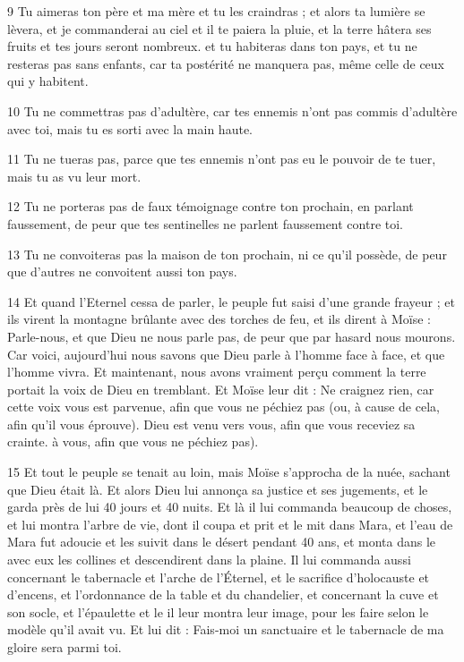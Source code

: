 \par 9 Tu aimeras ton père et ma mère et tu les craindras ; et alors ta lumière se lèvera, et je commanderai au ciel et il te paiera la pluie, et la terre hâtera ses fruits et tes jours seront nombreux. et tu habiteras dans ton pays, et tu ne resteras pas sans enfants, car ta postérité ne manquera pas, même celle de ceux qui y habitent.

\par 10 Tu ne commettras pas d'adultère, car tes ennemis n'ont pas commis d'adultère avec toi, mais tu es sorti avec la main haute.

\par 11 Tu ne tueras pas, parce que tes ennemis n'ont pas eu le pouvoir de te tuer, mais tu as vu leur mort.

\par 12 Tu ne porteras pas de faux témoignage contre ton prochain, en parlant faussement, de peur que tes sentinelles ne parlent faussement contre toi.

\par 13 Tu ne convoiteras pas la maison de ton prochain, ni ce qu'il possède, de peur que d'autres ne convoitent aussi ton pays.

\par 14 Et quand l'Eternel cessa de parler, le peuple fut saisi d'une grande frayeur ; et ils virent la montagne brûlante avec des torches de feu, et ils dirent à Moïse : Parle-nous, et que Dieu ne nous parle pas, de peur que par hasard nous mourons. Car voici, aujourd’hui nous savons que Dieu parle à l’homme face à face, et que l’homme vivra. Et maintenant, nous avons vraiment perçu comment la terre portait la voix de Dieu en tremblant. Et Moïse leur dit : Ne craignez rien, car cette voix vous est parvenue, afin que vous ne péchiez pas (ou, à cause de cela, afin qu'il vous éprouve). Dieu est venu vers vous, afin que vous receviez sa crainte. à vous, afin que vous ne péchiez pas).

\par 15 Et tout le peuple se tenait au loin, mais Moïse s'approcha de la nuée, sachant que Dieu était là. Et alors Dieu lui annonça sa justice et ses jugements, et le garda près de lui 40 jours et 40 nuits. Et là il lui commanda beaucoup de choses, et lui montra l'arbre de vie, dont il coupa et prit et le mit dans Mara, et l'eau de Mara fut adoucie et les suivit dans le désert pendant 40 ans, et monta dans le avec eux les collines et descendirent dans la plaine. Il lui commanda aussi concernant le tabernacle et l'arche de l'Éternel, et le sacrifice d'holocauste et d'encens, et l'ordonnance de la table et du chandelier, et concernant la cuve et son socle, et l'épaulette et le il leur montra leur image, pour les faire selon le modèle qu'il avait vu. Et lui dit : Fais-moi un sanctuaire et le tabernacle de ma gloire sera parmi toi.

